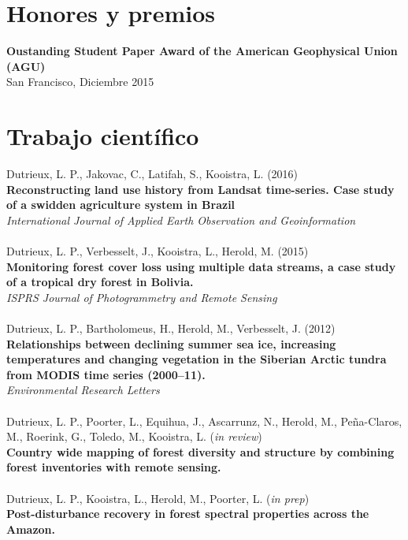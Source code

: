\documentclass[spanish]{friggeri-cv}
\begin{document}
\section{Honores y premios}
    \textbf{Oustanding Student Paper Award of the American Geophysical Union (AGU)}\\
    San Francisco, Diciembre 2015

\section{Trabajo científico}
    Dutrieux, L. P., Jakovac, C., Latifah, S., Kooistra, L. (2016)\\
    \textbf{Reconstructing land use history from Landsat time-series. Case study of a swidden agriculture system in Brazil}\\
    \textit{International Journal of Applied Earth Observation and Geoinformation}\\
    \\
    Dutrieux, L. P., Verbesselt, J., Kooistra, L., Herold, M. (2015)\\
    \textbf{Monitoring forest cover loss using multiple data streams, a case study of a tropical dry forest in Bolivia.}\\
    \textit{ISPRS Journal of Photogrammetry and Remote Sensing}\\
    \\
    Dutrieux, L. P., Bartholomeus, H., Herold, M., Verbesselt, J. (2012)\\
    \textbf{Relationships between declining summer sea ice, increasing temperatures and changing vegetation in the Siberian Arctic tundra from MODIS time series (2000–11).}\\
    \textit{Environmental Research Letters}\\
    \\
    Dutrieux, L. P., Poorter, L., Equihua, J., Ascarrunz, N., Herold, M., Pe\~{n}a-Claros, M., Roerink, G., Toledo, M., Kooistra, L. (\textit{in review})\\
    \textbf{Country wide mapping of forest diversity and structure by combining forest inventories with remote sensing.}\\
    \\
    Dutrieux, L. P., Kooistra, L., Herold, M., Poorter, L. (\textit{in prep})\\
    \textbf{Post-disturbance recovery in forest spectral properties across the Amazon.}\\
    \\
\end{document}
